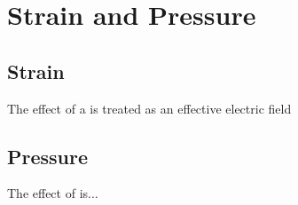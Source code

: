 \section{Strain and Pressure}
\subsection{Strain}
The effect of a  is treated as an effective electric
field 

\subsection{Pressure}
The effect of  is...

\cite{doi:10.1021/acs.nanolett.2c03378}
\cite{PhysRevLett.112.087601}
\cite{PhysRevLett.112.187601}
